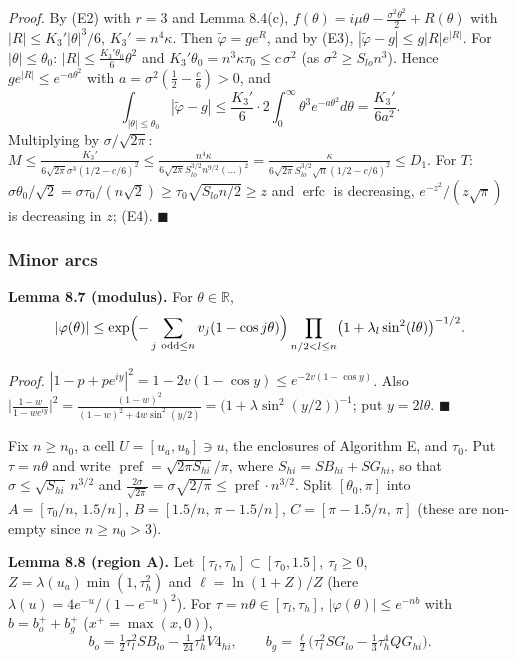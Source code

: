 \emph{Proof.} By (E2) with \(r=3\) and Lemma 8.4(c), \(f(\theta)=i\mu\theta-\frac{\sigma^2\theta^2}2+R(\theta)\) with \(|R|\le K_3'|\theta|^3/6\), \(K_3'=n^4\kappa\). Then \(\tilde\varphi=ge^R\), and by (E3), \(|\tilde\varphi-g|\le g|R|e^{|R|}\). For \(|\theta|\le\theta_0\): \(|R|\le\frac{K_3'\theta_0}{6}\theta^2\) and \(K_3'\theta_0=n^3\kappa\tau_0\le c\,\sigma^2\) (as \(\sigma^2\ge S_{lo}n^3\)). Hence \(ge^{|R|}\le e^{-a\theta^2}\) with \(a=\sigma^2(\frac12-\frac c6)>0\), and
\[\int_{|\theta|\le\theta_0}|\tilde\varphi-g|\le\frac{K_3'}{6}\cdot2\int_0^\infty\theta^3e^{-a\theta^2}d\theta=\frac{K_3'}{6a^2}.\]
Multiplying by \(\sigma/\sqrt{2\pi}\): \(M\le\frac{K_3'}{6\sqrt{2\pi}\sigma^3(1/2-c/6)^2}\le\frac{n^4\kappa}{6\sqrt{2\pi}S_{lo}^{3/2}n^{9/2}(\ldots)^2}=\frac{\kappa}{6\sqrt{2\pi}S_{lo}^{3/2}\sqrt n(1/2-c/6)^2}\le D_1\). For \(T\): \(\sigma\theta_0/\sqrt2=\sigma\tau_0/(n\sqrt2)\ge\tau_0\sqrt{S_{lo}n/2}\ge z\) and \(\operatorname{erfc}\) is decreasing, \(e^{-z^2}/(z\sqrt\pi)\) is decreasing in \(z\); (E4). \(\blacksquare\)

\subsubsection{Minor arcs}\label{minor-arcs}

\textbf{Lemma 8.7 (modulus).} For \(\theta\in\mathbb R\),
\[|\varphi(\theta)|\le\exp\Bigl(-\sum_{j\ \mathrm{odd}\le n}v_j(1-\cos j\theta)\Bigr)\prod_{n/2<l\le n}\bigl(1+\lambda_l\sin^2(l\theta)\bigr)^{-1/2}.\]

\emph{Proof.} \(|1-p+pe^{iy}|^2=1-2v(1-\cos y)\le e^{-2v(1-\cos y)}\). Also \(\bigl|\frac{1-w}{1-we^{iy}}\bigr|^2=\frac{(1-w)^2}{(1-w)^2+4w\sin^2(y/2)}=\bigl(1+\lambda\sin^2(y/2)\bigr)^{-1}\); put \(y=2l\theta\). \(\blacksquare\)

Fix \(n\ge n_0\), a cell \(U=[u_a,u_b]\ni u\), the enclosures of Algorithm E, and \(\tau_0\). Put \(\tau=n\theta\) and write \(\operatorname{pref}=\sqrt{2\pi S_{hi}}/\pi\), where \(S_{hi}=SB_{hi}+SG_{hi}\), so that \(\sigma\le\sqrt{S_{hi}}\,n^{3/2}\) and \(\frac{2\sigma}{\sqrt{2\pi}}=\sigma\sqrt{2/\pi}\le\operatorname{pref}\cdot n^{3/2}\). Split \([\theta_0,\pi]\) into \(A=[\tau_0/n,\,1.5/n]\), \(B=[1.5/n,\,\pi-1.5/n]\), \(C=[\pi-1.5/n,\,\pi]\) (these are non-empty since \(n\ge n_0>3\)).

\textbf{Lemma 8.8 (region A).} Let \([\tau_l,\tau_h]\subset[\tau_0,1.5]\), \(\tau_l\ge0\), \(Z=\lambda(u_a)\min(1,\tau_h^2)\) and \(\ell=\ln(1+Z)/Z\) (here \(\lambda(u)=4e^{-u}/(1-e^{-u})^2\)). For \(\tau=n\theta\in[\tau_l,\tau_h]\), \(|\varphi(\theta)|\le e^{-nb}\) with \(b=b_o^++b_g^+\) (\(x^+=\max(x,0)\)),
\[b_o=\tfrac12\tau_l^2SB_{lo}-\tfrac1{24}\tau_h^4V4_{hi},\qquad b_g=\tfrac\ell2\bigl(\tau_l^2SG_{lo}-\tfrac13\tau_h^4QG_{hi}\bigr).\]


